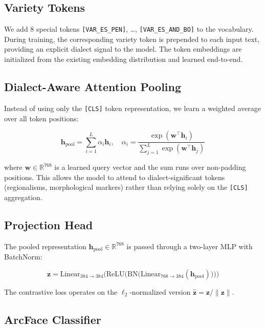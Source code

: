 \documentclass[11pt,a4paper]{article}
\newcommand{\RR}{\mathbb{R}}
\begin{document}
\subsection{Variety Tokens}

We add 8 special tokens \texttt{[VAR\_ES\_PEN]}, \ldots,
\texttt{[VAR\_ES\_AND\_BO]} to the vocabulary. During training, the
corresponding variety token is prepended to each input text, providing an
explicit dialect signal to the model. The token embeddings are initialized from
the existing embedding distribution and learned end-to-end.

\subsection{Dialect-Aware Attention Pooling}

Instead of using only the \texttt{[CLS]} token representation, we learn a
weighted average over all token positions:

\begin{equation}
    \mathbf{h}_{\text{pool}} = \sum_{i=1}^{L} \alpha_i \mathbf{h}_i, \quad
    \alpha_i = \frac{\exp(\mathbf{w}^\top \mathbf{h}_i)}
    {\sum_{j=1}^{L} \exp(\mathbf{w}^\top \mathbf{h}_j)}
\end{equation}

where $\mathbf{w} \in \RR^{768}$ is a learned query vector and the sum runs
over non-padding positions. This allows the model to attend to
dialect-significant tokens (regionalisms, morphological markers) rather than
relying solely on the \texttt{[CLS]} aggregation.

\subsection{Projection Head}

The pooled representation $\mathbf{h}_{\text{pool}} \in \RR^{768}$ is passed
through a two-layer MLP with BatchNorm:

\begin{equation}
    \mathbf{z} = \text{Linear}_{384 \to 384}\Big(
    \text{ReLU}\big(\text{BN}\big(\text{Linear}_{768 \to 384}
    (\mathbf{h}_{\text{pool}})\big)\big)\Big)
\end{equation}

The contrastive loss operates on the $\ell_2$-normalized version
$\hat{\mathbf{z}} = \mathbf{z} / \|\mathbf{z}\|$.

\subsection{ArcFace Classifier}
\end{document}
